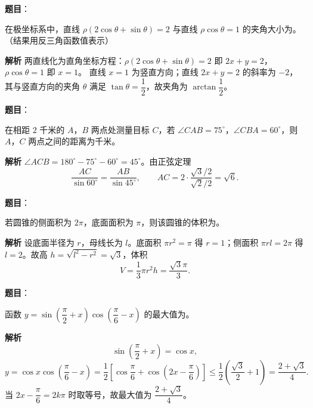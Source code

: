 \begin{answer}

\textbf{题目}：

在极坐标系中，直线 $\rho(2\cos\theta+\sin\theta)=2$ 与直线 $\rho\cos\theta=1$ 的夹角大小为\gkblank{}。（结果用反三角函数值表示）

\textbf{解析}
两直线化为直角坐标方程：$\rho(2\cos\theta+\sin\theta)=2$ 即 $2x+y=2$，$\rho\cos\theta=1$ 即 $x=1$。
直线 $x=1$ 为竖直方向；直线 $2x+y=2$ 的斜率为 $-2$，其与竖直方向的夹角 $\theta$ 满足 $\tan\theta=\dfrac12$，故夹角为 $\arctan\dfrac12$。


\end{answer}
\begin{answer}

\textbf{题目}：

在相距 $2$ 千米的 $A$，$B$ 两点处测量目标 $C$，若 $\angle CAB=75^\circ$，$\angle CBA=60^\circ$，则 $A$，$C$ 两点之间的距离为\gkblank{}千米。

\textbf{解析}
$\angle ACB=180^\circ-75^\circ-60^\circ=45^\circ$。由正弦定理
\nopagebreak[4]
\[\frac{AC}{\sin60^\circ}=\frac{AB}{\sin45^\circ},\qquad AC=2\cdot\frac{\sqrt3/2}{\sqrt2/2}=\sqrt6.\]


\end{answer}
\begin{answer}

\textbf{题目}：

若圆锥的侧面积为 $2\pi$，底面面积为 $\pi$，则该圆锥的体积为\gkblank{}。

\textbf{解析}
设底面半径为 $r$，母线长为 $l$。底面积 $\pi r^2=\pi$ 得 $r=1$；侧面积 $\pi rl=2\pi$ 得 $l=2$。故高 $h=\sqrt{l^2-r^2}=\sqrt3$，体积
\nopagebreak[4]
\[V=\frac13\pi r^2h=\frac{\sqrt3\pi}{3}.\]


\end{answer}
\begin{answer}

\textbf{题目}：

函数 $y=\sin\left(\dfrac\pi2+x\right)\cos\left(\dfrac\pi6-x\right)$ 的最大值为\gkblank{}。

\textbf{解析}
\nopagebreak[4]
\[\sin\left(\frac\pi2+x\right)=\cos x,\]
\nopagebreak[4]
\[y=\cos x\cos\left(\frac\pi6-x\right)=\frac12\left[\cos\frac\pi6+\cos\left(2x-\frac\pi6\right)\right]\leqslant\frac12\left(\frac{\sqrt3}2+1\right)=\frac{2+\sqrt3}4.\]
当 $2x-\dfrac\pi6=2k\pi$ 时取等号，故最大值为 $\dfrac{2+\sqrt3}4$。


\end{answer}
